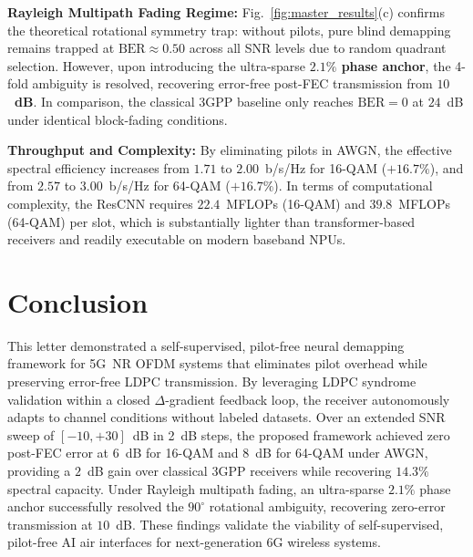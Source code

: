 ﻿\documentclass[journal,twoside]{IEEEtran}
\begin{document}
\textbf{Rayleigh Multipath Fading Regime:}
Fig.~\ref{fig:master_results}(c) confirms the theoretical rotational symmetry trap:
without pilots, pure blind demapping remains trapped at $\text{BER} \approx 0.50$ across all SNR levels
due to random quadrant selection.
However, upon introducing the ultra-sparse \textbf{$2.1\%$ phase anchor}, the 4-fold ambiguity is resolved,
recovering error-free post-FEC transmission from \textbf{$10$~dB}.
In comparison, the classical 3GPP baseline only reaches $\text{BER} = 0$ at $24$~dB under identical
block-fading conditions.

\textbf{Throughput and Complexity:}
By eliminating pilots in AWGN, the effective spectral efficiency increases from $1.71$ to $2.00$~b/s/Hz
for 16-QAM ($+16.7\%$), and from $2.57$ to $3.00$~b/s/Hz for 64-QAM ($+16.7\%$).
In terms of computational complexity, the ResCNN requires $22.4$~MFLOPs (16-QAM) and $39.8$~MFLOPs (64-QAM)
per slot, which is substantially lighter than transformer-based receivers and readily executable on modern
baseband NPUs.

\section{Conclusion}\label{sec:conclusion}

This letter demonstrated a self-supervised, pilot-free neural demapping framework
for 5G~NR OFDM systems that eliminates pilot overhead while preserving error-free
LDPC transmission.
By leveraging LDPC syndrome validation within a closed $\Delta$-gradient feedback loop,
the receiver autonomously adapts to channel conditions without labeled datasets.
Over an extended SNR sweep of $[-10, +30]$~dB in 2~dB steps, the proposed framework
achieved zero post-FEC error at $6$~dB for 16-QAM and $8$~dB for 64-QAM under AWGN,
providing a $2$~dB gain over classical 3GPP receivers while recovering $14.3\%$
spectral capacity.
Under Rayleigh multipath fading, an ultra-sparse $2.1\%$ phase anchor successfully
resolved the $90^\circ$ rotational ambiguity, recovering zero-error transmission at $10$~dB.
These findings validate the viability of self-supervised, pilot-free AI air interfaces
for next-generation 6G wireless systems.
\end{document}
